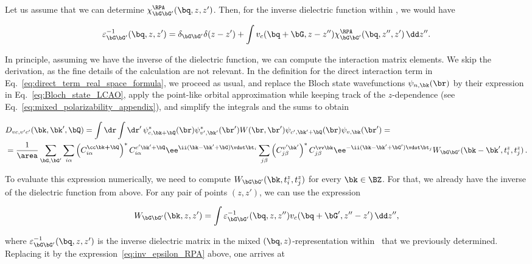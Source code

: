 Let us assume that we can determine $\chi^{\RPA}_{\bG \bG'}(\bq,z,z')$.
Then, for the inverse dielectric function within \rpa, we would have

\begin{equation}
 \label{eq:inv_epsilon_RPA}
\varepsilon_{\bG \bG'}^{-1}(\bq,z,z') = \delta_{\bG \bG'} \delta(z-z')+\int v_{c}( \bq +\bG,z-z'')\chi^{\RPA}_{\bG \bG'}(\bq,z'',z') \, \dd z''.
\end{equation}

In principle, assuming we have the inverse of the dielectric function,
we can compute the interaction matrix elements.
We skip the derivation, as the fine details of the calculation are not relevant.
In the definition for the direct interaction term in Eq.~\eqref{eq:direct_term_real_space_formula}, we proceed as usual, and replace the Bloch state wavefunctions $\psi_{n, \bk}(\br)$ by their expression in Eq.~\eqref{eq:Bloch_state_LCAO}, apply the point-like orbital approximation while keeping track of the $z$-dependence (see Eq.~\eqref{eq:mixed_polarizability_appendix}), and simplify the integrals and the sums to obtain

\begin{equation}
\begin{aligned} & D_{vc,v'c'}( \bk,\bk',\bQ) = \int\dr\int\dr'\,\psi_{c,\bk + \bQ}^{*}(\br)\psi_{v',\bk'}^{*}(\br')W(\br,\br')\psi_{c',\bk'+\bQ}(\br)\psi_{v,\bk}(\br') = \\
 &  = \frac{1}{\area} \sum_{\bG, \bG'} \sum_{i\alpha} \left(C_{i\alpha}^{\cc\bk\boldsymbol{+}\bQ}\right)^{*}C_{i\alpha}^{c'\bk'+\bQ}\ee^{ \ii ( \bk-\bk'+\bG) \vdot \bt_{i}} \sum_{j\beta}\left(C_{j\beta}^{v'\bk'}\right)^{*}C_{j\beta}^{\vv\bk}\ee^{- \ii ( \bk-\bk'+\bG') \vdot \bt_{j}}W_{\bG \bG'}( \bk-\bk',t_{i}^{z},t_{j}^{z})\,.
\end{aligned}
\end{equation}

\noindent To evaluate this expression numerically, we need to compute $W_{\bG \bG'}( \bk,t_{i}^{z},t_{j}^{z})$
for every $\bk\in\BZ$.
For that, we already have the inverse of the dielectric function from above.
For any pair of points $(z,z')$, we can use the expression

\begin{equation}
W_{\bG \bG'}(\bk,z,z') = \int\varepsilon_{\bG \bG'}^{-1}(\bq,z,z'')v_{c}( \bq +\bG',z''-z')\,\dd z'' ,
\end{equation}

\noindent where $\varepsilon_{\bG \bG'}^{-1}(\bq,z,z')$
is the inverse dielectric matrix in the mixed $(\bq,z)$-representation within \rpa~that we previously determined.
Replacing it by the expression~\eqref{eq:inv_epsilon_RPA} above, one arrives at

